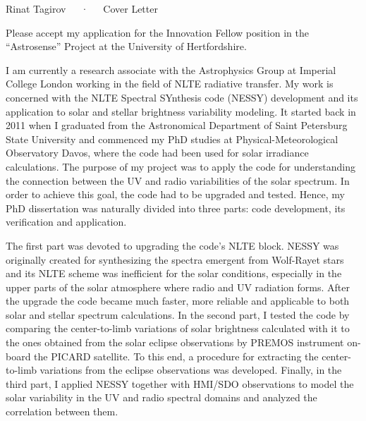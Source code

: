 \documentclass[11pt, a4paper]{awesome-cv}
\begin{document}

\makecvfooter
  {}
  {Rinat Tagirov~~~·~~~Cover Letter}
  {}

\makelettertitle

\begin{cvletter}

Please accept my application for the Innovation Fellow position in the ``Astrosense'' Project at the University of Hertfordshire.

I am currently a research associate with the Astrophysics Group at Imperial College London
working in the field of NLTE radiative transfer.
My work is concerned with the NLTE Spectral SYnthesis code (NESSY) development and its application to
solar and stellar brightness variability modeling.
It started back in 2011 when I graduated from the Astronomical Department of Saint Petersburg State University
and commenced my PhD studies at Physical-Meteorological Observatory Davos,
where the code had been used for solar irradiance calculations.
The purpose of my project was to apply the code for understanding the connection between the UV and radio variabilities of the solar spectrum.
In order to achieve this goal, the code had to be upgraded and tested.
Hence, my PhD dissertation was naturally divided into three parts: code development, its verification and application.

The first part was devoted to upgrading the code's NLTE block.
NESSY was originally created for synthesizing the spectra emergent from Wolf-Rayet stars and its NLTE scheme
was inefficient for the solar conditions, especially in the upper parts of the solar atmosphere
where radio and UV radiation forms. After the upgrade the code became much faster, more reliable 
and applicable to both solar and stellar spectrum calculations.
In the second part, I tested the code by comparing the center-to-limb variations of solar brightness calculated with it
to the ones obtained from the solar eclipse observations by PREMOS instrument on-board the PICARD satellite.
To this end, a procedure for extracting the center-to-limb variations from the eclipse observations was developed.
Finally, in the third part, I applied NESSY together with HMI/SDO observations to model the solar variability in the UV and radio
spectral domains and analyzed the correlation between them.


\end{cvletter}
\end{document}
